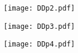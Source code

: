 \begin{figure}[h]
	\centering
	\texttt{[image: DDp2.pdf]}
\end{figure}

\begin{figure}[h]
	\centering
	\texttt{[image: DDp3.pdf]}
\end{figure}

\begin{figure}[h]
	\centering
	\texttt{[image: DDp4.pdf]}
\end{figure}

%
